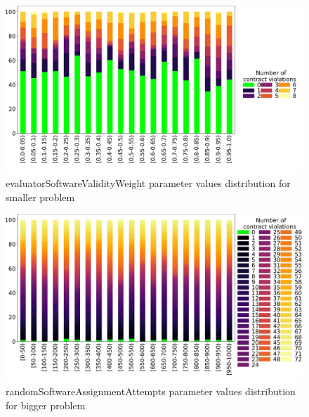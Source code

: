 \begin{figure}
	\centering
	\includegraphics[width=\textwidth]{images/DistrValiditySmall/evaluatorSoftwareValidityWeight.pdf}
	\caption[evaluatorSoftwareValidityWeight parameter values distribution for smaller problem]{evaluatorSoftwareValidityWeight parameter values distribution for smaller problem}
	\label{fig:evaluatorSoftwareValidityWeight_DistSmall}
\end{figure}
\begin{figure}
	\centering
	\includegraphics[width=\textwidth]{images/DistrValidityBig/randomSoftwareAssignmentAttempts.pdf}
	\caption[randomSoftwareAssignmentAttempts parameter values distribution for bigger problem]{randomSoftwareAssignmentAttempts parameter values distribution for bigger problem}
	\label{fig:randomSoftwareAssignmentAttempts_DistBig}
\end{figure}
